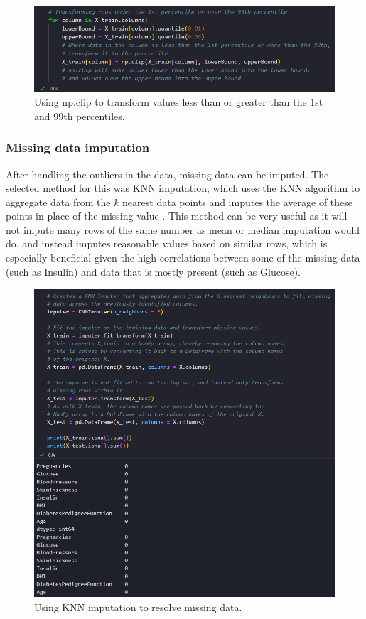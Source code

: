 \documentclass[12pt]{report}
\begin{document}
\begin{figure}[H]
    \centering
    \includegraphics[width=\linewidth]{Preprocessing/OutlierConstraining.png}
    \caption{Using np.clip to transform values less than or greater than the 1st and 99th percentiles.}
    \label{fig:OutlierConstraining}
\end{figure}

\pagebreak 

\subsubsection{Missing data imputation}
After handling the outliers in the data, missing data can be imputed. The selected method for this was KNN imputation,
which uses the KNN algorithm to aggregate data from the $k$ nearest data points and imputes the average of these points 
in place of the missing value \autocite{trainindata_knn_2024}. This method can be very useful as it will not impute many rows 
of the same number as mean or median imputation would do, and instead imputes reasonable values based on similar rows,
which is especially beneficial given the high correlations between some of the missing data (such as Insulin) and data 
that is mostly present (such as Glucose).

\begin{figure}[H]
    \centering
    \includegraphics[width=.8\linewidth]{Preprocessing/KNNImputation.png}
    \caption{Using KNN imputation to resolve missing data.}
    \label{fig:KNNImputation}
\end{figure}
\end{document}
